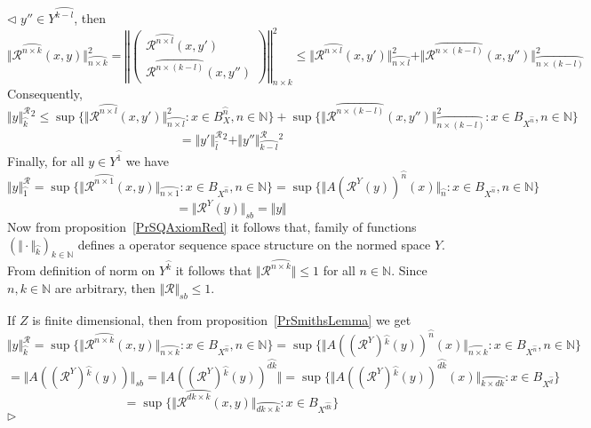 \documentclass[12pt]{article}
\newenvironment{proof}{\par $\triangleleft$}{$\triangleright$}
\begin{document}
\begin{proof}
$y''\in Y^{\wideparen{k-l}}$, then
$$
\Vert \mathcal{R}^{\wideparen{n\times k}}(x,y)\Vert_{\wideparen{n\times k}}^2
=\left\Vert
\begin{pmatrix}
    \mathcal{R}^{\wideparen{n\times l}}(x,y')\\
    \mathcal{R}^{\wideparen{n\times (k-l)}}(x,y'')
\end{pmatrix}
\right\Vert_{n\times k}^2 
\leq
\Vert
    \mathcal{R}^{\wideparen{n\times l}}(x,y')
\Vert_{\wideparen{n\times l}}^2 
+\Vert
    \mathcal{R}^{\wideparen{n\times (k-l)}}(x,y'')
\Vert_{\wideparen{n\times (k-l)}}^2
$$
Consequently,
$$
\Vert y\Vert_{\wideparen{k}}^{\mathcal{R}}{}^2
\leq\sup \{
    \Vert
        \mathcal{R}^{\wideparen{n\times l}}(x,y')
    \Vert_{\wideparen{n\times l}}^2
    :x\in B_X^{\wideparen{n}},n\in\mathbb{N} 
\} 
+\sup \{
    \Vert
        \mathcal{R}^{\wideparen{n\times (k-l)}}(x,y'')
    \Vert_{\wideparen{n\times (k-l)}}^2
    :x\in B_{X^{\wideparen{n}}},n\in\mathbb{N} 
 \}
$$
$$
=\Vert y'\Vert_{\wideparen{l}}^{\mathcal{R}}{}^2 +\Vert
y''\Vert_{\wideparen{k-l}}^{\mathcal{R}}{}^2
$$
Finally, for all $y\in Y^{\wideparen{1}}$ we have
$$
\Vert y\Vert_{\wideparen{1}}^{\mathcal{R}}
=\sup \{\Vert
    \mathcal{R}^{\wideparen{n\times 1}}(x,y)\Vert_{\wideparen{n\times 1}}
    :x\in B_{X^{\wideparen{n}}},n\in\mathbb{N} 
 \} 
=\sup \{\Vert
    {A(\mathcal{R}^Y(y))}^{\wideparen{n}}(x)\Vert_{\wideparen{n}}
    :x\in B_{X^{\wideparen{n}}},n\in\mathbb{N} 
 \}
$$
$$
=\Vert \mathcal{R}^Y(y)\Vert_{sb}=\Vert y\Vert
$$
Now from proposition~\ref{PrSQAxiomRed} it follows that, family of functions 
${(\Vert\cdot\Vert_{\wideparen{k}})}_{k\in\mathbb{N}}$ defines a 
operator sequence space structure on the normed space $Y$. 
From definition of norm on 
$Y^{\wideparen{k}}$ it follows that 
$\Vert\mathcal{R}^{\wideparen{n\times k}}\Vert\leq 1$ for all $n\in\mathbb{N}$. 
Since $n,k\in\mathbb{N}$ are arbitrary, then $\Vert\mathcal{R}\Vert_{sb}\leq 1$.

If $Z$ is finite dimensional, then from proposition~\ref{PrSmithsLemma} we get
$$
\Vert y\Vert_{\wideparen{k}}^{\mathcal{R}}
=\sup \{
    \Vert\mathcal{R}^{\wideparen{n\times k}}(x,y)
\Vert_{\wideparen{n\times k}}:x\in B_{X^{\wideparen{n}}},n\in\mathbb{N} \} 
=\sup \{
    \Vert 
        {A((\mathcal{R}^Y){}^{\wideparen{k}}(y))}^{\wideparen{n}}(x)
    \Vert_{\wideparen{n\times k}}
    :x\in B_{X^{\wideparen{n}}},n\in\mathbb{N}
 \}
$$
$$
=\Vert A((\mathcal{R}^Y){}^{\wideparen{k}}(y))\Vert_{sb} 
=\Vert  
    {A((\mathcal{R}^Y){}^{\wideparen{k}}(y))}^{\wideparen{dk}}
\Vert
=\sup \{
    \Vert
        {A((\mathcal{R}^Y){}^{\wideparen{k}}(y))}^{\wideparen{dk}}(x)
    \Vert_{\wideparen{k\times dk}}
    :x\in B_{X^{\wideparen{d}}}
 \}
$$
$$
=\sup \{
    \Vert
        \mathcal{R}^{\wideparen{dk\times k}}(x,y)
    \Vert_{\wideparen{dk\times k}}
    :x\in B_{X^{\wideparen{dk}}}
 \}
$$
\end{proof}
\end{document}
